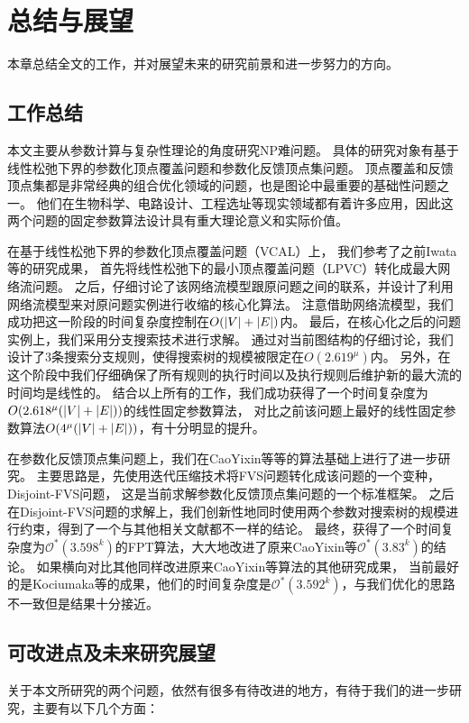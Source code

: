 ﻿\chapter{总结与展望}

本章总结全文的工作，并对展望未来的研究前景和进一步努力的方向。

\section{工作总结}
本文主要从参数计算与复杂性理论的角度研究NP难问题。
具体的研究对象有基于线性松弛下界的参数化顶点覆盖问题和参数化反馈顶点集问题。
顶点覆盖和反馈顶点集都是非常经典的组合优化领域的问题，也是图论中最重要的基础性问题之一。
他们在生物科学、电路设计、工程选址等现实领域都有着许多应用，因此这两个问题的固定参数算法设计具有重大理论意义和实际价值。

在基于线性松弛下界的参数化顶点覆盖问题（VCAL）上，
我们参考了之前Iwata等的研究成果，
首先将线性松弛下的最小顶点覆盖问题（LPVC）转化成最大网络流问题。
之后，仔细讨论了该网络流模型跟原问题之间的联系，并设计了利用网络流模型来对原问题实例进行收缩的核心化算法。
注意借助网络流模型，我们成功把这一阶段的时间复杂度控制在$O(\left\vert V \right\vert + \left\vert E \right\vert)$内。
最后，在核心化之后的问题实例上，我们采用分支搜索技术进行求解。
通过对当前图结构的仔细讨论，我们设计了3条搜索分支规则，使得搜索树的规模被限定在$O(2.619^\mu)$内。
另外，在这个阶段中我们仔细确保了所有规则的执行时间以及执行规则后维护新的最大流的时间均是线性的。
结合以上所有的工作，我们成功获得了一个时间复杂度为$O(2.618^\mu(\left\vert V \right\vert + \left\vert E \right\vert))$的线性固定参数算法，
对比之前该问题上最好的线性固定参数算法$O(4^\mu(\left\vert V \right\vert + \left\vert E \right\vert))$，有十分明显的提升。


在参数化反馈顶点集问题上，我们在CaoYixin等等的算法基础上进行了进一步研究。
主要思路是，先使用迭代压缩技术将FVS问题转化成该问题的一个变种，Disjoint-FVS问题，
这是当前求解参数化反馈顶点集问题的一个标准框架。
之后在Disjoint-FVS问题的求解上，我们创新性地同时使用两个参数对搜索树的规模进行约束，得到了一个与其他相关文献都不一样的结论。
最终，获得了一个时间复杂度为$\mathcal{O}^*(3.598^k)$的FPT算法，大大地改进了原来CaoYixin等$\mathcal{O}^*(3.83^k)$的结论。
如果横向对比其他同样改进原来CaoYixin等算法的其他研究成果，
当前最好的是Kociumaka等的成果，他们的时间复杂度是$\mathcal{O}^*(3.592^k)$，与我们优化的思路不一致但是结果十分接近。


\section{可改进点及未来研究展望}
关于本文所研究的两个问题，依然有很多有待改进的地方，有待于我们的进一步研究，主要有以下几个方面：

